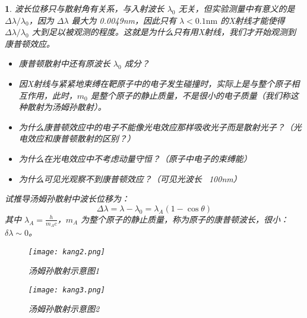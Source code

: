 \documentclass[UTF8]{report}
\theoremstyle{MyLineTheoremStyle} %
\theoremstyle{MyBlockTheoremStyle} %
\theoremstyle{MySubsubsectionStyle} %
\newtheorem{definition}{}
\begin{document}
\begin{definition}
波长位移只与散射角有关系，与入射波长 \(\lambda_0\) 无关，但实验测量中有意义的是 \(\Delta \lambda / \lambda_0\)，因为 \(\Delta \lambda\) 最大为 0.0049nm，因此只有 \(\lambda < 0.1 \text{nm}\) 的X射线才能使得 \(\Delta \lambda / \lambda_0\) 大到足以被观测的程度。这就是为什么只有用X射线，我们才开始观测到康普顿效应。

\begin{itemize}
    \item 康普顿散射中还有原波长 \(\lambda_0\) 成分？
    \item 因X射线与紧紧地束缚在靶原子中的电子发生碰撞时，实际上是与整个原子相互作用，此时，\(m_0\) 是整个原子的静止质量，不是很小的电子质量（我们称这种散射为汤姆孙散射）。
    \item 为什么康普顿效应中的电子不能像光电效应那样吸收光子而是散射光子？（光电效应和康普顿散射的区别？）
    \item 为什么在光电效应中不考虑动量守恒？（原子中电子的束缚能）
    \item 为什么可见光观察不到康普顿效应？（可见光波长 ~100nm）
\end{itemize}

试推导汤姆孙散射中波长位移为：
\[
\Delta \lambda = \lambda - \lambda_0 = \lambda_A (1 - \cos \theta)
\]
其中 \(\lambda_A = \frac{h}{m_A c}\)，\(m_A\) 为整个原子的静止质量，称为原子的康普顿波长，很小：\(\delta \lambda \sim 0\)。

\begin{figure}
    \centering
    \texttt{[image: kang2.png]}
    \caption{汤姆孙散射示意图1}
\end{figure}

\begin{figure}
    \centering
    \texttt{[image: kang3.png]}
    \caption{汤姆孙散射示意图2}
\end{figure}
\end{definition}
\end{document}
